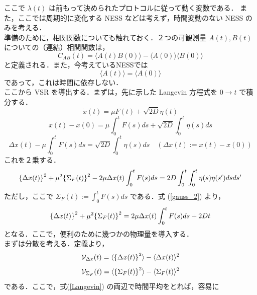 \documentclass{jsarticle}
\numberwithin{equation}{section}
\theoremstyle{definition}
\newcommand{\ave}[1]{\langle #1 \rangle}
\begin{document}
ここで $\lambda (t)$ は前もって決められたプロトコルに従って動く変数である．
また，ここでは周期的に変化する NESS などは考えず，時間変動のない NESS のみを考える．\\
\quad 準備のために，相関関数についても触れておく．２つの可観測量 $A(t), B(t)$ についての（連結）相関関数は，
\begin{equation}
  C_{AB} (t) = \ave{A(t) B(0)} - \ave{A(0)} \ave{B(0)}
\end{equation}
と定義される．また，今考えているNESSでは
\begin{equation}
  \label{NESS}
  \ave{A(t)} = \ave{A(0)}
\end{equation}
であって，これは時間に依存しない．\\
\quad ここから VSR を導出する．まずは，先に示した Langevin 方程式を $0 \to t$ で積分する．
\begin{equation}
  \label{Langevin}
  \dot{x}(t) = \mu F(t) + \sqrt{2D} \eta(t)
\end{equation}
\begin{equation}
  x(t) - x(0) = \mu \int_0^t F(s) ds + \sqrt{2D} \int_0^t \eta(s)ds
\end{equation}
\begin{equation}
  \Delta x(t) - \mu \int_0^t F(s) ds = \sqrt{2D} \int_0^t \eta(s)ds \quad (\Delta x(t) := x(t) - x(0))
\end{equation}
これを２乗する．
\begin{equation}
  \qty{ \Delta x(t) } ^2 + \mu^2 \qty{\Sigma_F (t)} ^2 - 2\mu \Delta x(t) \int_0^t F(s) ds = 2D \int_0^t \int_0^t \eta(s) \eta(s') dsds'
\end{equation}
ただし，ここで $\Sigma_F (t) := \int_0^t F(s) ds$ である．式 (\ref{gauss_2}) より，
\begin{equation}
  \label{totyu1}
  \qty{ \Delta x(t) } ^2 + \mu^2 \qty{\Sigma_F (t)} ^2 = 2\mu \Delta x(t) \int_0^t F(s) ds + 2Dt
\end{equation}
となる．ここで，便利のために幾つかの物理量を導入する．\\
\quad まずは分散を考える．定義より，
\begin{equation}
  \mathcal{V} _{\Delta x} (t) = \langle \qty{ \Delta x(t) } ^2 \rangle - \langle \Delta x(t) \rangle^2
\end{equation}
\begin{equation}
  \mathcal{V} _{\Sigma_F} (t) = \langle \qty{ \Sigma_F (t) } ^2 \rangle - \langle \Sigma_F (t) \rangle^2
\end{equation}
である．ここで，式(\ref{Langevin}) の両辺で時間平均をとれば，容易に
\end{document}
